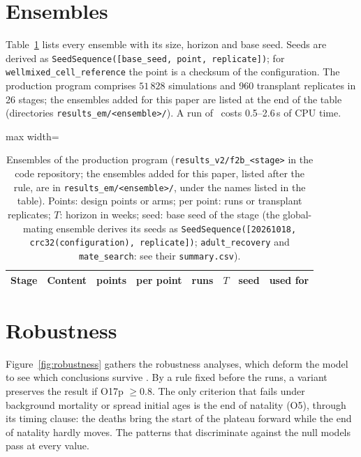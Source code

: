 \documentclass[preprint,12pt,authoryear]{elsarticle}
\begin{document}
\section{Ensembles}
\label{supp:ensembles}

Table~\ref{tab:res-ensembles} lists every ensemble with its size, horizon and base seed. Seeds are derived as
\texttt{SeedSequence([base\_seed, point, replicate])}; for \texttt{wellmixed\_cell\_reference} the point is a checksum of the
configuration. The production program comprises $51\,828$ simulations and 960 transplant replicates in 26 stages;
the ensembles added for this paper are listed at the end of the table (directories \texttt{results\_em/<ensemble>/}). A run of \Cone\ costs 0.5--2.6\,s of CPU time.

\begin{table}[ht]
\centering
\caption{Ensembles of the production program (\texttt{results\_v2/f2b\_<stage>} in the code repository; the ensembles added for this paper, listed after the rule, are in \texttt{results\_em/<ensemble>/}, under the names listed in the table). Points:
design points or arms; per point: runs or transplant replicates; $T$: horizon in weeks; seed: base seed of the
stage (the global-mating ensemble derives its seeds as \texttt{SeedSequence([20261018, crc32(configuration), replicate])};
\texttt{adult\_recovery} and \texttt{mate\_search}: see their \texttt{summary.csv}).}
\label{tab:res-ensembles}
\scriptsize
\setlength{\tabcolsep}{3pt}
\begin{adjustbox}{max width=\textwidth}
\begin{tabular}{@{}lp{5.6cm}rrrrrl@{}}
\toprule
Stage & Content & points & per point & runs & $T$ & seed & used for \\
\midrule

\end{tabular}
\end{adjustbox}
\end{table}


\section{Robustness}
\label{supp:robustness}

Figure~\ref{fig:robustness} gathers the robustness analyses, which deform the model to see which conclusions
survive \citep{GrimmBerger2016}. By a rule fixed before the runs, a variant preserves the
result if O17p $\ge0.8$. The only criterion that fails under background mortality or spread initial ages is the end
of natality (O5), through its timing clause: the deaths bring the start of the plateau forward while the end of
natality hardly moves. The patterns that discriminate against the null models pass at every value.
\end{document}

